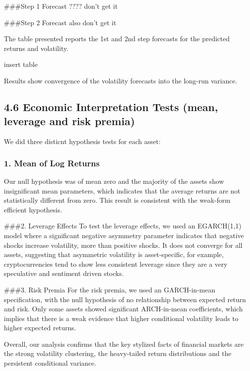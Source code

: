 \documentclass[
]{article}
\begin{document}
\#\#\#Step 1 Forecast ???? don't get it

\#\#\#Step 2 Forecast also don't get it

The table presented reports the 1st and 2nd step forecasts for the
predicted returns and volatility.

insert table

Results show convergence of the volatility forecasts into the long-run
variance.

\subsection{4.6 Economic Interpretation Tests (mean, leverage and risk
premia)}\label{economic-interpretation-tests-mean-leverage-and-risk-premia}

We did three disticnt hypothesis tests for each asset:

\subsubsection{1. Mean of Log Returns}\label{mean-of-log-returns}

Our null hypothesis was of mean zero and the majority of the assets show
insignificant mean parameters, which indicates that the average returns
are not statistically different from zero. This result is consistent
with the weak-form efficient hypothesis.

\#\#\#2. Leverage Effects To test the leverage effects, we used an
EGARCH(1,1) model where a significant negative asymmetry parameter
indicates that negative shocks increase volatility, more than positive
shocks. It does not converge for all assets, suggesting that asymmetric
volatility is asset-specific, for example, cryptocurrencies tend to show
less consistent leverage since they are a very speculative and sentiment
driven stocks.

\#\#\#3. Risk Premia For the risk premia, we used an GARCH-in-mean
specification, with the null hypothesis of no relationship between
expected return and risk. Only some assets showed significant
ARCH-in-mean coefficients, which implies that there is a weak evidence
that higher conditional volatility leads to higher expected returns.

Overall, our analysis confirms that the key stylized facts of financial
markets are the strong volatility clustering, the heavy-tailed return
distributions and the persistent conditional variance.
\end{document}
